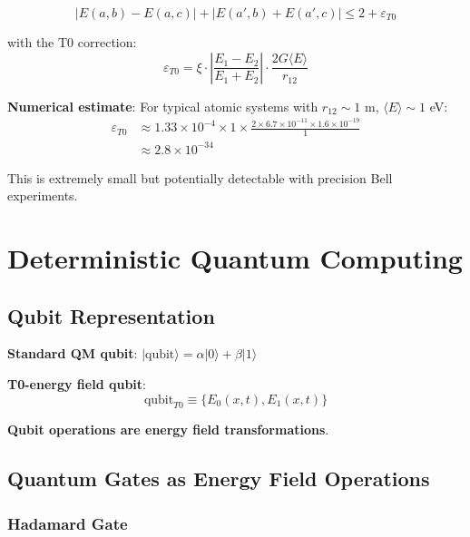 \documentclass[12pt,a4paper]{article}
\newcommand{\Efield}{E}
\newcommand{\xipar}{\xi}
\begin{document}
	\begin{equation}
		\boxed{|E(a,b) - E(a,c)| + |E(a',b) + E(a',c)| \leq 2 + \varepsilon_{T0}}
	\end{equation}
	
	with the T0 correction:
	\begin{equation}
		\varepsilon_{T0} = \xipar \cdot \left|\frac{\Efield_1 - \Efield_2}{\Efield_1 + \Efield_2}\right| \cdot \frac{2G\langle E \rangle}{r_{12}}
	\end{equation}
	
	\textbf{Numerical estimate}:
	For typical atomic systems with $r_{12} \sim 1$ m, $\langle E \rangle \sim 1$ eV:
	\begin{align}
		\varepsilon_{T0} &\approx 1.33 \times 10^{-4} \times 1 \times \frac{2 \times 6.7 \times 10^{-11} \times 1.6 \times 10^{-19}}{1} \\
		&\approx 2.8 \times 10^{-34}
	\end{align}
	
	This is extremely small but potentially detectable with precision Bell experiments.
	
	\section{Deterministic Quantum Computing}
	
	\subsection{Qubit Representation}
	
	\textbf{Standard QM qubit}: $|\text{qubit}\rangle = \alpha|0\rangle + \beta|1\rangle$
	
	\textbf{T0-energy field qubit}:
	\begin{equation}
		\boxed{\text{qubit}_{T0} \equiv \{\Efield_0(x,t), \Efield_1(x,t)\}}
	\end{equation}
	
	\textbf{Qubit operations are energy field transformations}.
	
	\subsection{Quantum Gates as Energy Field Operations}
	
	\subsubsection{Hadamard Gate}
	
\end{document}
